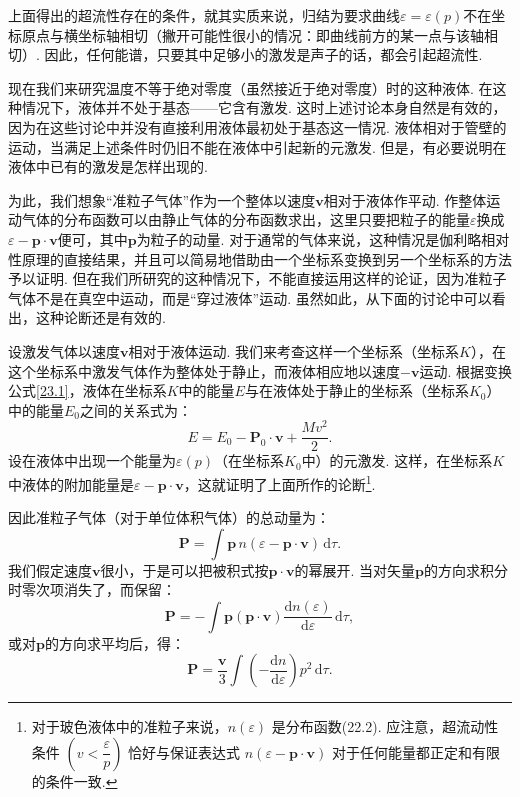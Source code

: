 上面得出的超流性存在的条件，就其实质来说，归结为要求曲线$\varepsilon=\varepsilon(p)$不在坐标原点与横坐标轴相切（撇开可能性很小的情况：即曲线前方的某一点与该轴相切）. 因此，任何能谱，只要其中足够小的激发是声子的话，都会引起超流性.

现在我们来研究温度不等于绝对零度（虽然接近于绝对零度）时的这种液体. 在这种情况下，液体并不处于基态——它含有激发. 这时上述讨论本身自然是有效的，因为在这些讨论中并没有直接利用液体最初处于基态这一情况. 液体相对于管壁的运动，当满足上述条件时仍旧不能在液体中引起新的元激发. 但是，有必要说明在液体中已有的激发是怎样出现的.

为此，我们想象“准粒子气体”作为一个整体以速度$\bm{v}$相对于液体作平动. 作整体运动气体的分布函数可以由静止气体的分布函数求出，这里只要把粒子的能量$\varepsilon$换成$\varepsilon-\bm{p}\cdot\bm{v}$便可，其中$\bm{p}$为粒子的动量. 对于通常的气体来说，这种情况是伽利略相对性原理的直接结果，并且可以简易地借助由一个坐标系变换到另一个坐标系的方法予以证明. 但在我们所研究的这种情况下，不能直接运用这样的论证，因为准粒子气体不是在真空中运动，而是“穿过液体”运动. 虽然如此，从下面的讨论中可以看出，这种论断还是有效的.

设激发气体以速度$\bm{v}$相对于液体运动. 我们来考查这样一个坐标系（坐标系$K$），在这个坐标系中激发气体作为整体处于静止，而液体相应地以速度$-\bm{v}$运动. 根据变换公式\eqref{23.1}，液体在坐标系$K$中的能量$E$与在液体处于静止的坐标系（坐标系$K_{0}$）中的能量$E_{0}$之间的关系式为：
\begin{equation*}
E=E_{0}-\bm{P}_{0}\cdot\bm{v}+\frac{Mv^{2}}{2}.
\end{equation*}
设在液体中出现一个能量为$\varepsilon(p)$（在坐标系$K_{0}$中）的元激发. 这样，在坐标系$K$中液体的附加能量是$\varepsilon-\bm{p}\cdot\bm{v}$，这就证明了上面所作的论断\footnote{对于玻色液体中的准粒子来说，$n(\varepsilon)$ 是分布函数(22.2). 应注意，超流动性条件 $\left(v<\dfrac{\varepsilon}{p}\right)$ 恰好与保证表达式 $n(\varepsilon-\bm{p}\cdot\bm{v})$ 对于任何能量都正定和有限的条件一致.}.

因此准粒子气体（对于单位体积气体）的总动量为：
\begin{equation*}
\bm{P}=\int\bm{p}\,n(\varepsilon-\bm{p}\cdot\bm{v})\,\mathrm{d}\tau.
\end{equation*}
我们假定速度$\bm{v}$很小，于是可以把被积式按$\bm{p}\cdot\bm{v}$的幂展开. 当对矢量$\bm{p}$的方向求积分时零次项消失了，而保留：
\begin{equation*}
\bm{P}=-\int\bm{p}(\bm{p}\cdot\bm{v})\frac{\mathrm{d}n(\varepsilon)}{\mathrm{d}\varepsilon}\,\mathrm{d}\tau,
\end{equation*}
或对$\bm{p}$的方向求平均后，得：
\begin{equation}
\bm{P}=\frac{\bm{v}}{3}\int\left(-\frac{\mathrm{d}n}{\mathrm{d}\varepsilon}\right)p^{2}\,\mathrm{d}\tau.
\label{23.4}
\end{equation}


